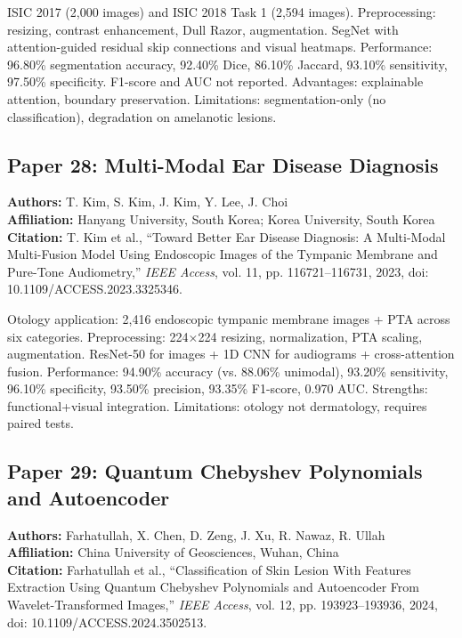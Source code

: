 \documentclass[conference]{IEEEtran}
\begin{document}
ISIC 2017 (2,000 images) and ISIC 2018 Task 1 (2,594 images). Preprocessing: resizing, contrast enhancement, Dull Razor, augmentation. SegNet with attention-guided residual skip connections and visual heatmaps. Performance: 96.80\% segmentation accuracy, 92.40\% Dice, 86.10\% Jaccard, 93.10\% sensitivity, 97.50\% specificity. F1-score and AUC not reported. Advantages: explainable attention, boundary preservation. Limitations: segmentation-only (no classification), degradation on amelanotic lesions.

\subsection{Paper 28: Multi-Modal Ear Disease Diagnosis}

\noindent\textbf{Authors:} T. Kim, S. Kim, J. Kim, Y. Lee, J. Choi\\
\textbf{Affiliation:} Hanyang University, South Korea; Korea University, South Korea\\
\textbf{Citation:} T. Kim et al., ``Toward Better Ear Disease Diagnosis: A Multi-Modal Multi-Fusion Model Using Endoscopic Images of the Tympanic Membrane and Pure-Tone Audiometry,'' \textit{IEEE Access}, vol. 11, pp. 116721--116731, 2023, doi: 10.1109/ACCESS.2023.3325346.

Otology application: 2,416 endoscopic tympanic membrane images + PTA across six categories. Preprocessing: 224×224 resizing, normalization, PTA scaling, augmentation. ResNet-50 for images + 1D CNN for audiograms + cross-attention fusion. Performance: 94.90\% accuracy (vs. 88.06\% unimodal), 93.20\% sensitivity, 96.10\% specificity, 93.50\% precision, 93.35\% F1-score, 0.970 AUC. Strengths: functional+visual integration. Limitations: otology not dermatology, requires paired tests.

\subsection{Paper 29: Quantum Chebyshev Polynomials and Autoencoder}

\noindent\textbf{Authors:} Farhatullah, X. Chen, D. Zeng, J. Xu, R. Nawaz, R. Ullah\\
\textbf{Affiliation:} China University of Geosciences, Wuhan, China\\
\textbf{Citation:} Farhatullah et al., ``Classification of Skin Lesion With Features Extraction Using Quantum Chebyshev Polynomials and Autoencoder From Wavelet-Transformed Images,'' \textit{IEEE Access}, vol. 12, pp. 193923--193936, 2024, doi: 10.1109/ACCESS.2024.3502513.
\end{document}
